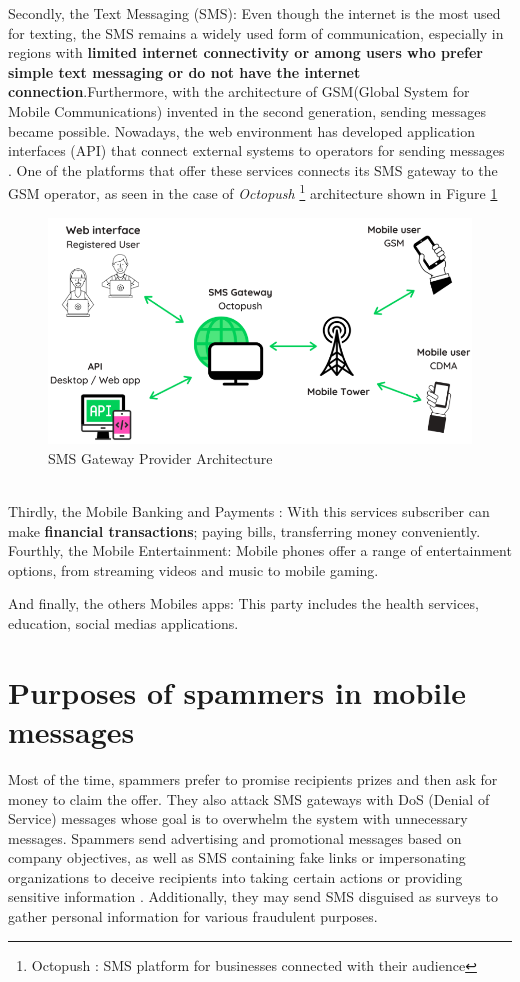 \documentclass[12pt,a4paper, oneside]{book}
\begin{document}
Secondly, the Text Messaging (SMS): Even though the internet is the most used for texting, the SMS remains a widely used form of communication, especially in regions with \textbf{limited internet connectivity or among users who prefer simple text messaging or do not have the internet connection}.Furthermore, with the architecture of GSM(Global System for Mobile Communications) invented in the second generation, sending messages became possible. Nowadays, the web environment has developed application interfaces (API) that connect external systems to operators for sending messages \citep{hassinen2003secure}. One of the platforms that offer these services connects its SMS gateway to the GSM operator, as seen in the case of \textit{Octopush} \footnote{Octopush : SMS platform for businesses connected with their audience} architecture shown in Figure \ref{fig:smsgateway}  
\begin{figure}[h]
	\centering
	\includegraphics[width=1\linewidth]{Images/SMSgateway}
	\caption{SMS Gateway Provider Architecture \citep{nataf_sms_gateway}}
	\label{fig:smsgateway} 
\end{figure}
 \\
 
Thirdly, the Mobile Banking and Payments : With this services subscriber can make \textbf{financial transactions}; paying bills, transferring money conveniently. \\

Fourthly, the Mobile Entertainment: Mobile phones offer a range of entertainment options, from streaming videos and music to mobile gaming. 

And finally, the others Mobiles apps: This party includes the health services, education, social medias applications.
\section{Purposes of spammers in mobile messages}
Most of the time, spammers prefer to promise recipients prizes and then ask for money to claim the offer. They also attack SMS gateways with DoS (Denial of Service) messages \citep{androulidakis2013fimess} whose goal is to overwhelm the system with unnecessary messages. Spammers send advertising and promotional messages based on company objectives, as well as SMS containing fake links or impersonating organizations to deceive recipients into taking certain actions or providing sensitive information \citep{tang2022clues}. Additionally, they may send SMS disguised as surveys to gather personal information for various fraudulent purposes. 
\end{document}
